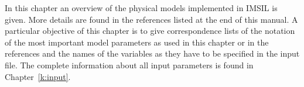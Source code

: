 In this chapter an overview of the physical models implemented in IMSIL 
is given. More details are found in the references listed at the end of
this manual. A particular objective of this chapter is to give 
correspondence lists of the notation of the most important model 
parameters as used in this chapter or in the references and the names of 
the variables as they have to be specified in the input file. The complete 
information about all input parameters is found in Chapter~\ref{k:input}.
